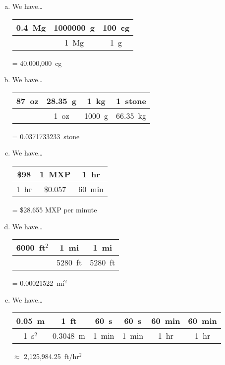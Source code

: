 \documentclass[11pt,letterpaper]{article}
\begin{document}
\sol 
\begin{enumerate}[(a)]
\item We have\dots \par
	\begin{table}[H]
	\centering
	\begin{tabular}{c||c|c}
	0.4~Mg & 1000000~g & 100~cg \\ \hline
		    & 1~Mg         & 1~g
	\end{tabular}\;= 40,000,000~cg
	\end{table} \pspace

\item We have\dots \par
	\begin{table}[H]
	\centering
	\begin{tabular}{c||c|c|c}
	87~oz & 28.35~g & 1~kg	   & 1~stone \\ \hline
		  & 1~oz	    & 1000~g & 66.35~kg
	\end{tabular}\;= 0.0371733233~stone
	\end{table} \pspace

\item We have\dots \par
	\begin{table}[H]
	\centering
	\begin{tabular}{c||c|c}
	\$98 & 1~MXP & 1~hr \\ \hline
	1~hr	& \$0.057 & 60~min
	\end{tabular}\;= \$28.655 MXP per minute
	\end{table} \pspace
	
\item We have\dots \par
	\begin{table}[H]
	\centering
	\begin{tabular}{c||c|c}
	6000~ft$^2$ & 1~mi      & 1~mi \\ \hline
			    & 5280~ft  & 5280~ft
	\end{tabular}\;= 0.00021522~mi$^2$
	\end{table} \pspace

\item We have\dots \par
	\begin{table}[H]
	\centering
	\begin{tabular}{c||c|c|c|c|c}
	0.05~m & 1~ft		& 60~s & 60~s	     & 60~min & 60~min \\ \hline
	1~s$^2$ & 0.3048~m & 1~min & 1~min & 1~hr & 1~hr
	\end{tabular}\;$\approx$ 2,125,984.25~ft/hr$^2$
	\end{table}
\end{enumerate}
\end{document}
